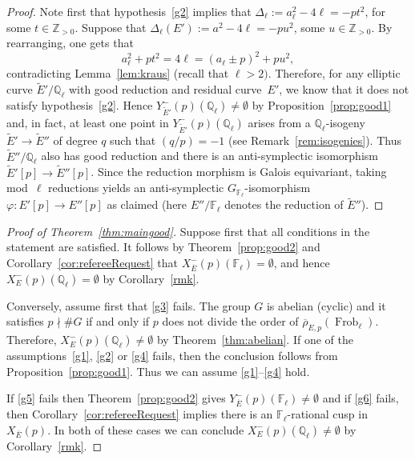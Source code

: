 \documentclass[12pt]{amsart}
\numberwithin{equation}{section}
\theoremstyle{definition}
\newcommand{\F}{\mathbb{F}}
\newcommand{\Q}{\mathbb{Q}}
\newcommand{\Z}{\mathbb{Z}}
\newcommand{\rhobar}{{\overline{\rho}}}
\newcommand{\Xp}{X_E^{-}(p)}
\DeclareMathOperator{\Frob}{Frob}
\newcommand{\oE}{\overline{E}}
\begin{document}
\begin{proof}
Note first that hypothesis~\eqref{g2} implies that $\Delta_\ell:=a_\ell^2-4\ell=-p t^2$, for some $t\in \Z_{>0}$.
Suppose that $\Delta_\ell(E'):=a^2-4\ell =-pu^2$, some $u\in \Z_{>0}$. By rearranging, one gets that 
\[
a_\ell^2+p t^2 = 4\ell = (a_\ell\pm p)^2+pu^2,
\]
contradicting Lemma~\ref{lem:kraus} (recall that $\ell > 2)$. Therefore, 
for any elliptic curve $\widetilde{E}'/\Q_\ell$ with good reduction and residual curve~$E'$, we know that it 
does not satisfy hypothesis~\eqref{g2}. 
Hence $Y_{\widetilde{E}'}^-(p)(\Q_\ell) \neq \emptyset$ by Proposition~\ref{prop:good1} and, in fact, at least one point in $Y_{\widetilde{E}'}^-(p)(\Q_\ell)$ arises from a $\Q_\ell$-isogeny $\widetilde{E}' \to \widetilde{E}''$ of degree $q$ such that $(q/p)=-1$ (see Remark~\ref{rem:isogenies}). Thus $\widetilde{E}''/\Q_\ell$ also has good reduction 
and there is an anti-symplectic isomorphism $\widetilde{E}'[p] \to \widetilde{E}''[p]$. Since the reduction morphism is Galois equivariant, taking mod~$\ell$ reductions yields 
an anti-symplectic $G_{\F_\ell}$-isomorphism $\varphi : E'[p] \to E''[p]$ as claimed (here $E''/\F_\ell$ denotes the reduction of $\widetilde{E}''$).    
\end{proof}

\begin{proof}[Proof of Theorem~\ref{thm:maingood}]
 
Suppose first that all conditions in the statement are satisfied. It follows by Theorem~\ref{prop:good2} and Corollary~\ref{cor:refereeRequest} that $X_{\oE}^-(p)(\F_\ell)=\emptyset$, and hence  $\Xp(\Q_\ell)=\emptyset$ by Corollary~\ref{rmk}.

Conversely, assume first that \eqref{g3} fails. The group $G$ is abelian (cyclic) and it satisfies $p\nmid \#G$ if and only if $p$ does not divide the order of $\rhobar_{E,p}(\Frob_\ell)$. Therefore, $\Xp(\Q_\ell)\neq\emptyset$ by Theorem~\ref{thm:abelian}. 
If one of the assumptions~\eqref{g1}, \eqref{g2} or \eqref{g4} fails, then the conclusion follows from Proposition~\ref{prop:good1}. Thus we can assume \eqref{g1}--\eqref{g4} hold.

If \eqref{g5} fails then Theorem~\ref{prop:good2} gives $Y_{\oE}^-(p)(\F_\ell)\neq \emptyset$ and if \eqref{g6} fails, then Corollary~\ref{cor:refereeRequest} implies there is an $\F_\ell$-rational cusp in $X_{\oE}(p)$. In both of these cases we can conclude $\Xp(\Q_\ell)\neq\emptyset$ by Corollary~\ref{rmk}.
\end{proof}
\end{document}
